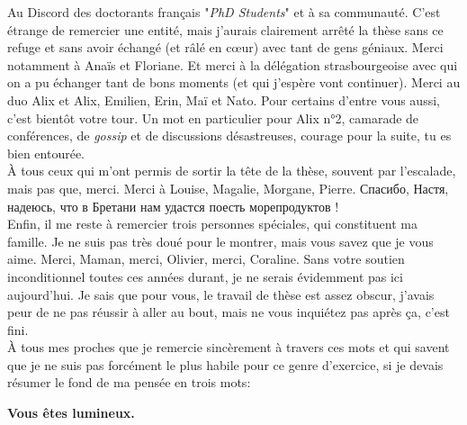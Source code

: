 Au Discord des doctorants français "\textit{PhD Students}" et à sa communauté. C'est étrange de remercier une entité, mais j'aurais clairement arrêté la thèse sans ce refuge et sans avoir échangé (et râlé en cœur) avec tant de gens géniaux. Merci notamment à Anaïs et Floriane. Et merci à la délégation strasbourgeoise avec qui on a pu échanger tant de bons moments (et qui j'espère vont continuer). Merci au duo Alix et Alix, Emilien, Erin, Maï et Nato. Pour certains d'entre vous aussi, c'est bientôt votre tour. Un mot en particulier pour Alix n°2, camarade de conférences, de \textit{gossip} et de discussions désastreuses, courage pour la suite, tu es bien entourée. \\

À tous ceux qui m'ont permis de sortir la tête de la thèse, souvent par l'escalade, mais pas que, merci. Merci à Louise, Magalie, Morgane, Pierre. \selectfont Спасибо, Настя, надеюсь, что в Бретани нам удастся поесть морепродуктов !\selectfont \\

Enfin, il me reste à remercier trois personnes spéciales, qui constituent ma famille. Je ne suis pas très doué pour le montrer, mais vous savez que je vous aime. Merci, Maman, merci, Olivier, merci, Coraline. Sans votre soutien inconditionnel toutes ces années durant, je ne serais évidemment pas ici aujourd'hui. Je sais que pour vous, le travail de thèse est assez obscur, j'avais peur de ne pas réussir à aller au bout, mais ne vous inquiétez pas après ça, c'est fini. \\

À tous mes proches que je remercie sincèrement à travers ces mots et qui savent que je ne suis pas forcément le plus habile pour ce genre d'exercice, si je devais résumer le fond de ma pensée en trois mots: \\
\begin{center}
\Large \textbf{Vous êtes lumineux.}
\end{center}
